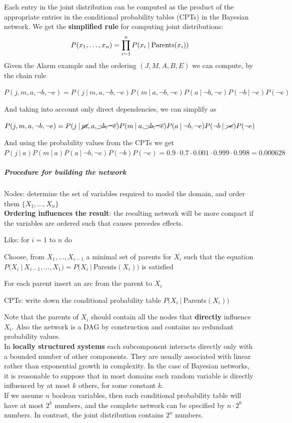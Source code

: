 \documentclass[10pt]{report}
\begin{document}
Each entry in the joint distribution can be computed as the product of the appropriate entries in the conditional probability tables (CPTs) in the Bayesian network. We get the \textbf{simplified rule} for computing joint distributions: $$P(x_1,\ldots,x_n) = \prod_{i=1}^n P(x_i\:|\:\hbox{Parents}(x_i))$$
Given the Alarm example and the ordering $(J,M,A,B,E)$ we can compute, by the chain rule \begin{list}{}{}
	\item $P(j,m,a,\neg b, \neg e) = P(j\:|\:m,a,\neg b, \neg e)P(m\:|\:a,\neg b, \neg e)P(a\:|\:\neg b, \neg e)P(\neg b\:|\:\neg e)P(\neg e)$
\end{list}
And taking into account only direct dependencies, we can simplify as \begin{list}{}{}
	\item $P(j,m,a,\neg b, \neg e) = P(j\:|\:\cancel{m},a,\cancel{\neg b, \neg e})P(m\:|\:a,\cancel{\neg b, \neg e})P(a\:|\:\neg b, \neg e)P(\neg b\:|\:\cancel{\neg e})P(\neg e)$
\end{list}
And using the probability values from the CPTs we get $P(j\:|\:a)P(m\:|\:a)P(a\:|\:\neg b,\neg e)P(\neg b)P(\neg e) = 0.9\cdot0.7\cdot0.001\cdot0.999\cdot0.998=0.000628$
\subparagraph{Procedure for building the network}
\begin{list}{}{}
	\item Nodes: determine the set of variables required to model the domain, and order them $\{X_1,\ldots,X_n\}$\\
	\textbf{Ordering influences the result}: the resulting network will be more compact if the variables are ordered such that causes precedes effects.
	\item Liks: for $i=1$ to $n$ do
	\begin{list}{}{}
		\item Choose, from $X_1,\ldots,X_{i-1}$ a minimal set of parents for $X_i$ such that the equation $P(X_i\:|\:X_{i-1},\ldots,X_1) = P(X_i\:|\:$Parents$(X_i))$ is satisfied
		\item For each parent insert an arc from the parent to $X_i$
		\item CPTs: write down the conditional probability table $P(X_i\:|\:$Parents$(X_i))$
	\end{list}
\end{list}
Note that the parents of $X_i$ should contain all the nodes that \textbf{directly} influence $X_i$. Also the network is a DAG by construction and contains no redundant probability values.\\
In \textbf{locally structured systems} each subcomponent interacts directly only with a bounded number of other components. They are usually associated with linear rather than exponential growth in complexity. In the case of Bayesian networks, it is reasonable to suppose that in most domains each random variable is directly influenced by at most $k$ others, for some constant $k$.\\
If we assume $n$ boolean variables, then each conditional probability table will have at most $2^k$ numbers, and the complete network can be specified by $n\cdot2^k$ numbers. In contrast, the joint distribution contains $2^n$ numbers.
\end{document}
